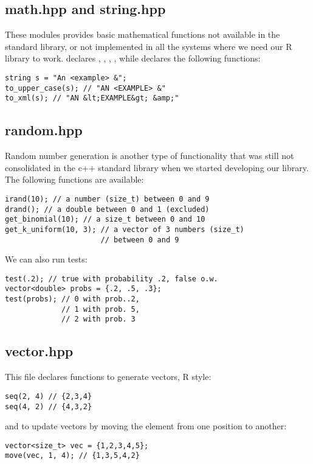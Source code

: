 \subsection{math.hpp and string.hpp}

These modules provides basic mathematical functions not available in the standard library, or not implemented in all the systems where we need our R library to work.  declares , , , , while  declares the following functions:

\begin{lstlisting}[style=c++]
string s = "An <example> &";
to_upper_case(s); // "AN <EXAMPLE> &"
to_xml(s); // "AN &lt;EXAMPLE&gt; &amp;"
\end{lstlisting}

\subsection{random.hpp}

Random number generation is another type of functionality that was still not consolidated in the c++ standard library when we started developing our library. The following functions are available:
\begin{lstlisting}[style=c++]
irand(10); // a number (size_t) between 0 and 9 
drand(); // a double between 0 and 1 (excluded)
get_binomial(10); // a size_t between 0 and 10
get_k_uniform(10, 3); // a vector of 3 numbers (size_t) 
                      // between 0 and 9 
\end{lstlisting}

We can also run tests:
\begin{lstlisting}[style=c++]
test(.2); // true with probability .2, false o.w.
vector<double> probs = {.2, .5, .3};
test(probs); // 0 with prob..2, 
             // 1 with prob. 5, 
             // 2 with prob. 3
\end{lstlisting}

\subsection{vector.hpp}

This file declares functions to generate vectors, R style:
\begin{lstlisting}[style=c++]
seq(2, 4) // {2,3,4}
seq(4, 2) // {4,3,2}
\end{lstlisting}
and to update vectors by moving the element from one position to another:
\begin{lstlisting}[style=c++]
vector<size_t> vec = {1,2,3,4,5};
move(vec, 1, 4); // {1,3,5,4,2}
\end{lstlisting}
    

